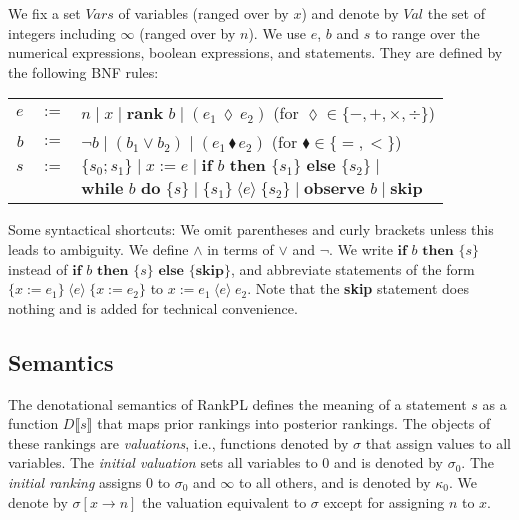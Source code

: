 \documentclass{llncs}
\newcommand{\vars}{\textit{Vars}}
\newcommand{\values}{\textit{Val}}
\newcommand{\dn}[1]{D\llbracket #1 \rrbracket}
\newcommand{\Rank}[1]{\hspace{3pt} \pmb{\langle} #1 \pmb{\rangle}\hspace{3pt} } %
\newcommand{\areth}{\lozenge}
\newcommand{\comp}{\blacklozenge}
\begin{document}
We fix a set $\vars$ of variables (ranged over by $x$) and denote by $\values$ the set of integers including $\infty$ (ranged over by $n$).
We use $e$, $b$ and $s$ to range over the numerical expressions, boolean expressions, and statements.
They are defined by the following BNF rules:
\noindent \begin{center}
\begin{tabular}{rcl}
$\textit{e}$	& $:=$ 	& $n \mid x \mid \textbf{rank }b \mid (e_1 \hspace{2pt} \areth \hspace{2pt} e_2)$ (for $\areth \in \{ -, +, \times, \div \}$)\\

$\textit{b}$	& $:=$ 	& $\neg b \mid (b_1 \vee b_2) \mid (e_1 \hspace{2pt} \comp \hspace{2pt} e_2)$ (for $\comp \in \{ =, < \}$)\\

$\textit{s}$		& $:=$ 	& $\{s_0; s_1 \} \mid x := e \mid \textbf{if }b\textbf{ then }\{ s_1 \}\textbf{ else } \{ s_2 \} \mid $\\
			& 		& $\textbf{while } b \textbf{ do } \{ s \} \mid \{ s_1 \} \Rank{e} \{ s_2 \} \mid \textbf{observe }b \mid \textbf{skip}$\\
\end{tabular}
\end{center}
Some syntactical shortcuts: 
We omit parentheses and curly brackets unless this leads to ambiguity.
We define $\wedge$ in terms of $\vee$ and $\neg$.
We write $\textbf{if }b\textbf{ then } \{ s \}$ instead of $\textbf{if }b\textbf{ then } \{ s \}$ $\textbf{else }\{\textbf{skip}\}$,
	and abbreviate statements of the form $\{x := e_1\} \Rank{e} \{x := e_2\}$ to $x := e_1 \Rank{e} e_2$.
Note that the \textbf{skip} statement does nothing and is added for technical convenience.

\subsection{Semantics}
\label{sec:formalsemantics}

The denotational semantics of RankPL defines the meaning of a statement $s$ as a function $\dn{s}$ that maps prior rankings into posterior rankings.
The objects of these rankings are \emph{valuations}, i.e., functions denoted by $\sigma$ that assign values to all variables.
The \emph{initial valuation} sets all variables to 0 and is denoted by $\sigma_0$.
The \emph{initial ranking} assigns 0 to $\sigma_0$ and $\infty$ to all others, and is denoted by $\kappa_0$.
We denote by $\sigma[x \rightarrow n]$ the valuation equivalent to $\sigma$ except for assigning $n$ to $x$.
\end{document}
